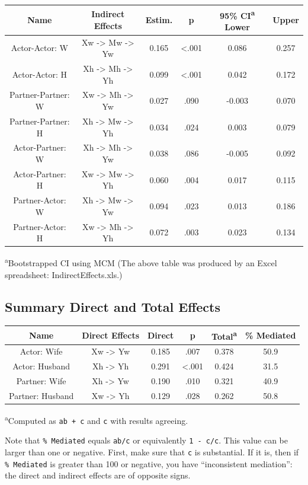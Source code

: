 \documentclass[
  english,
  man,floatsintext]{apa6}
\begin{document}
\begin{longtable}[]{@{}cccccc@{}}
\toprule
Name & Indirect Effects & Estim. & p & 95\% CI\textsuperscript{a} Lower & Upper\tabularnewline
\midrule
\endhead
Actor-Actor: W & Xw -\textgreater{} Mw -\textgreater{} Yw & 0.165 & \textless.001 & 0.086 & 0.257\tabularnewline
Actor-Actor: H & Xh -\textgreater{} Mh -\textgreater{} Yh & 0.099 & \textless.001 & 0.042 & 0.172\tabularnewline
Partner-Partner: W & Xw -\textgreater{} Mh -\textgreater{} Yw & 0.027 & .090 & -0.003 & 0.070\tabularnewline
Partner-Partner: H & Xh -\textgreater{} Mw -\textgreater{} Yh & 0.034 & .024 & 0.003 & 0.079\tabularnewline
Actor-Partner: W & Xh -\textgreater{} Mh -\textgreater{} Yw & 0.038 & .086 & -0.005 & 0.092\tabularnewline
Actor-Partner: H & Xw -\textgreater{} Mw -\textgreater{} Yh & 0.060 & .004 & 0.017 & 0.115\tabularnewline
Partner-Actor: W & Xh -\textgreater{} Mw -\textgreater{} Yw & 0.094 & .023 & 0.013 & 0.186\tabularnewline
Partner-Actor: H & Xw -\textgreater{} Mh -\textgreater{} Yh & 0.072 & .003 & 0.023 & 0.134\tabularnewline
\bottomrule
\end{longtable}

\textsuperscript{a}Bootstrapped CI using MCM
(The above table was produced by an Excel spreadsheet: IndirectEffects.xls.)

\hypertarget{summary-direct-and-total-effects}{%
\subsection{Summary Direct and Total Effects}\label{summary-direct-and-total-effects}}

\begin{longtable}[]{@{}cccccc@{}}
\toprule
Name & Direct Effects & Direct & p & Total\textsuperscript{a} & \% Mediated\tabularnewline
\midrule
\endhead
Actor: Wife & Xw -\textgreater{} Yw & 0.185 & .007 & 0.378 & 50.9\tabularnewline
Actor: Husband & Xh -\textgreater{} Yh & 0.291 & \textless.001 & 0.424 & 31.5\tabularnewline
Partner: Wife & Xh -\textgreater{} Yw & 0.190 & .010 & 0.321 & 40.9\tabularnewline
Partner: Husband & Xw -\textgreater{} Yh & 0.129 & .028 & 0.262 & 50.8\tabularnewline
\bottomrule
\end{longtable}

\textsuperscript{a}Computed as \texttt{ab\ +\ c\textquotesingle{}} and \texttt{c} with results agreeing.

Note that \texttt{\%\ Mediated} equals \texttt{ab/c} or equivalently \texttt{1\ -\ c\textquotesingle{}/c}. This value can be larger than one or negative. First, make sure that \texttt{c} is substantial. If it is, then if \texttt{\%\ Mediated} is greater than 100 or negative, you have \enquote{inconsistent mediation}: the direct and indirect effects are of opposite signs.


\clearpage
\renewcommand{\listfigurename}{Figure captions}

\clearpage
\renewcommand{\listtablename}{Table captions}
\end{document}
